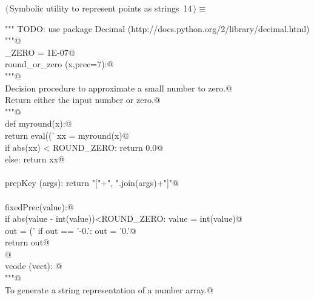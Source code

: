 \documentclass[11pt,oneside]{article}	%
\begin{document}
\begin{flushleft} \small
\begin{minipage}{\linewidth} \label{scrap39}
\protect{}$\langle\,$Symbolic utility to represent points as strings\nobreak\ {\footnotesize 14}$\,\rangle\equiv$
\vspace{-1ex}
\begin{list}{}{} \item
\mbox{}\verb@""" TODO: use package Decimal (http://docs.python.org/2/library/decimal.html) """@\\
\mbox{}\verb@ROUND_ZERO = 1E-07@\\
\mbox{}\verb@def round_or_zero (x,prec=7):@\\
\mbox{}\verb@   """@\\
\mbox{}\verb@   Decision procedure to approximate a small number to zero.@\\
\mbox{}\verb@   Return either the input number or zero.@\\
\mbox{}\verb@   """@\\
\mbox{}\verb@   def myround(x):@\\
\mbox{}\verb@      return eval(('%.'+str(prec)+'f') % round(x,prec))@\\
\mbox{}\verb@   xx = myround(x)@\\
\mbox{}\verb@   if abs(xx) < ROUND_ZERO: return 0.0@\\
\mbox{}\verb@   else: return xx@\\
\mbox{}\verb@@\\
\mbox{}\verb@def prepKey (args): return "["+", ".join(args)+"]"@\\
\mbox{}\verb@@\\
\mbox{}\verb@def fixedPrec(value):@\\
\mbox{}\verb@   if abs(value - int(value))<ROUND_ZERO: value = int(value)@\\
\mbox{}\verb@   out = ('%0.7f'% value).rstrip('0')@\\
\mbox{}\verb@   if out == '-0.': out = '0.'@\\
\mbox{}\verb@   return out@\\
\mbox{}\verb@   @\\
\mbox{}\verb@def vcode (vect): @\\
\mbox{}\verb@   """@\\
\mbox{}\verb@   To generate a string representation of a number array.@\\

\end{list}
\end{minipage}
\end{flushleft}
\end{document}
